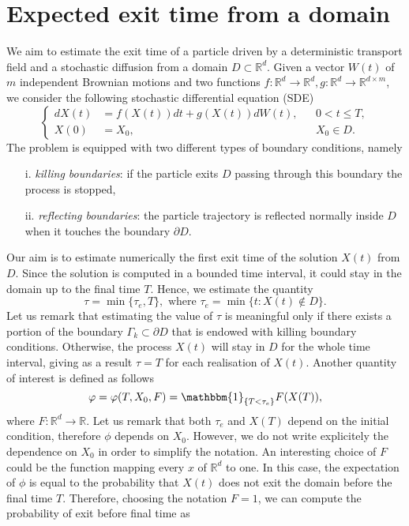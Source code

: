 \section{Expected exit time from a domain}
We aim to estimate the exit time of a particle driven by a deterministic transport field and a stochastic diffusion from a domain $D \subset \mathbb{R}^d$. Given a vector $W(t)$ of $m$ independent Brownian motions and two functions $f\colon \mathbb{R}^d \rightarrow \mathbb{R}^d, g \colon \mathbb{R}^d \rightarrow \mathbb{R}^{d\times m}$, we consider the following stochastic differential equation (SDE)
\begin{equation}\label{eq:GeneralModel}
\left \{
\begin{aligned}
	dX(t) &= f(X(t)) dt + g(X(t))dW(t), && 0 < t \leq T, \\
	X(0)  &= X_0, && X_0 \in D.
\end{aligned} \right .
\end{equation}
The problem is equipped with two different types of boundary conditions, namely
\begin{itemize}
	\item[i.]  \textit{killing boundaries}: if the particle exits $D$ passing through this boundary the process is stopped,
	\item[ii.] \textit{reflecting boundaries}: the particle trajectory is reflected normally inside $D$ when it touches the boundary $\partial D$.
\end{itemize}
Our aim is to estimate numerically the first exit time of the solution $X(t)$ from $D$. Since the solution is computed in a bounded time interval, it could stay in the domain up to the final time $T$. Hence, we estimate the quantity
\begin{equation}\label{eq:GeneralTau}
	\tau = \min\{\tau_e,T\}, \text{ where } \tau_e = \min\{t\colon X(t)\notin D\}.
\end{equation}
Let us remark that estimating the value of $\tau$ is meaningful only if there exists a portion of the boundary $\Gamma_k \subset \partial D$ that is endowed with killing boundary conditions. Otherwise, the process $X(t)$ will stay in $D$ for the whole time interval, giving as a result $\tau = T$ for each realisation of $X(t)$. Another quantity of interest is defined as follows
\begin{equation}\label{eq:GeneralPhi}
	\phi = \phi(T,X_0,F) = \mathbbm{1}_{\{T < \tau_e\}}F(X(T)),
\end{equation}
where $F\colon \mathbb{R}^d \rightarrow \mathbb{R}$. Let us remark that both $\tau_e$ and $X(T)$ depend on the initial condition, therefore $\phi$ depends on $X_0$. However, we do not write explicitely the dependence on $X_0$ in order to simplify the notation. An interesting choice of $F$ could be the function mapping every $x$ of $\mathbb{R}^d$ to one. In this case, the expectation of $\phi$ is equal to the probability that $X(t)$ does not exit the domain before the final time $T$. Therefore, choosing the notation $F = 1$, we can compute the probability of exit before final time as
